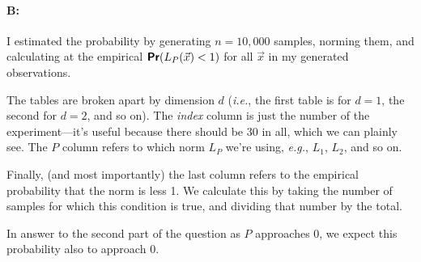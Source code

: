 \documentclass[11pt]{article}
\renewcommand{\Pr}{\textbf{\textsf{Pr}}}
\begin{document}
\paragraph{B:} 

I estimated the probability by generating $n=10,000$ samples, norming them, and calculating at the empirical $\Pr(L_P(\vec{x})  <1)$ for all $\vec{x}$ in my generated observations.

The tables are broken apart by dimension $d$ (\textit{i.e.}, the first table is for $d=1$, the second for $d = 2$, and so on). The \textit{index} column is just the number of the experiment---it's useful because there should be 30 in all, which we can plainly see. The $P$ column refers to which norm $L_P$ we're using, \textit{e.g.}, $L_1$, $L_2$, and so on.

Finally, (and most importantly) the last column refers to the empirical probability that the norm is less 1. We calculate this by taking the number of samples for which this condition is true, and dividing that number by the total.

In answer to the second part of the question as $P$ approaches 0, we expect this probability also to approach 0.
\end{document}
